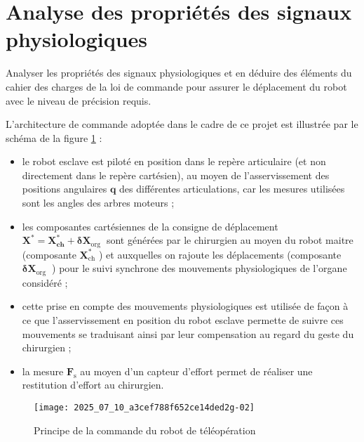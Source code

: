 \section{Analyse des propriétés des signaux physiologiques}

\begin{obj}
Analyser les propriétés des signaux physiologiques et en déduire des éléments du cahier des charges de la loi de commande pour assurer le déplacement du robot avec le niveau de précision requis.
\end{obj}

L'architecture de commande adoptée dans le cadre de ce projet est illustrée par le schéma de la figure \ref{ccs_psi_2019_fig_02} :

\begin{itemize}
  \item le robot esclave est piloté en position dans le repère articulaire (et non directement dans le repère cartésien), au moyen de l'asservissement des positions angulaires $\mathbf{q}$ des différentes articulations, car les mesures utilisées sont les angles des arbres moteurs ;
  \item les composantes cartésiennes de la consigne de déplacement $\mathbf{X}^{*}=\mathbf{X}_{\mathbf{c h}}^{*}+\boldsymbol{\delta} \mathbf{X}_{\text {org }}$ sont générées par le chirurgien au moyen du robot maitre (composante $\mathbf{X}_{\mathrm{ch}}^{*}$ ) et auxquelles on rajoute les déplacements (composante $\boldsymbol{\delta} \mathbf{X}_{\text {org }}$ ) pour le suivi synchrone des mouvements physiologiques de l'organe considéré ;
  \item cette prise en compte des mouvements physiologiques est utilisée de façon à ce que l'asservissement en position du robot esclave permette de suivre ces mouvements se traduisant ainsi par leur compensation au regard du geste du chirurgien ;
  \item la mesure $\mathbf{F}_{\mathrm{s}}$ au moyen d'un capteur d'effort permet de réaliser une restitution d'effort au chirurgien.
\end{itemize}


\begin{figure}[!h]
\centering
\texttt{[image: 2025\_07\_10\_a3cef788f652ce14ded2g-02]}

\caption{Principe de la commande du robot de téléopération\label{ccs_psi_2019_fig_02}}
\end{figure}



